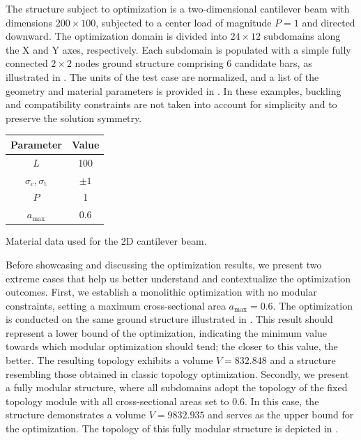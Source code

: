 The structure subject to optimization is a two-dimensional cantilever beam with dimensions $200\times100$, subjected to a center load of magnitude $P=1$ and directed downward. The optimization domain is divided into $24\times12$ subdomains along the X and Y axes, respectively. Each subdomain is populated with a simple fully connected $2\times2$ nodes ground structure comprising 6 candidate bars, as illustrated in . The units of the test case are normalized, and a list of the geometry and material parameters is provided in . In these examples, buckling and compatibility constraints are not taken into account for simplicity and to preserve the solution symmetry.

\begin{margintable}
    \small
    \centering
    \begin{tabular}{cc}
    \toprule
    \textbf{Parameter}        & \textbf{Value} \\ \midrule
    $L$              & 100     \\
    $\sigma_\text{c}, \sigma_\text{t}$ & $\pm 1$\\
    $P$              & 1   \\
    $a_\text{max}$              & 0.6   \\
    \bottomrule
    \end{tabular}
    \caption{Material data used for the 2D cantilever beam.}
    \label{tab:06_modular_cant_data}
\end{margintable}

Before showcasing and discussing the optimization results, we present two extreme cases that help us better understand and contextualize the optimization outcomes. First, we establish a monolithic optimization with no modular constraints, setting a maximum cross-sectional area $a_\text{max}=0.6$. The optimization is conducted on the same ground structure illustrated in . This result should represent a lower bound of the optimization, indicating the minimum value towards which modular optimization should tend; the closer to this value, the better. The resulting topology exhibits a volume $V=832.848$ and a structure resembling those obtained in classic topology optimization. Secondly, we present a fully modular structure, where all subdomains adopt the topology of the fixed topology module with all cross-sectional areas set to 0.6. In this case, the structure demonstrates a volume $V=9832.935$ and serves as the upper bound for the optimization. The topology of this fully modular structure is depicted in .

